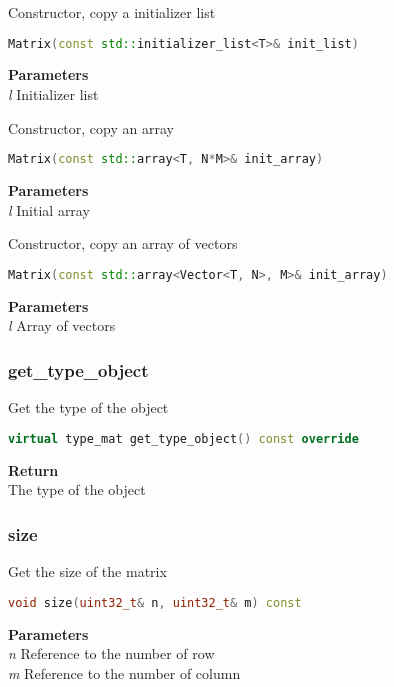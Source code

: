 \begin{mdframed}
Constructor, copy a initializer list
\begin{lstlisting}[language=C++]
Matrix(const std::initializer_list<T>& init_list)
\end{lstlisting}
\textbf{Parameters} \\ 
\textit{l} Initializer list \\ 
\end{mdframed}

\begin{mdframed}
Constructor, copy an array
\begin{lstlisting}[language=C++]
Matrix(const std::array<T, N*M>& init_array)
\end{lstlisting}
\textbf{Parameters} \\ 
\textit{l} Initial array \\ 
\end{mdframed}

\begin{mdframed}
Constructor, copy an array of vectors
\begin{lstlisting}[language=C++]
Matrix(const std::array<Vector<T, N>, M>& init_array)
\end{lstlisting}
\textbf{Parameters} \\ 
\textit{l} Array of vectors \\ 
\end{mdframed}

\subsubsection{get\_type\_object}
\begin{mdframed}
Get the type of the object
\begin{lstlisting}[language=C++]
virtual type_mat get_type_object() const override 
\end{lstlisting}
\textbf{Return} \\ 
The type of the object\\ 
\end{mdframed}

\subsubsection{size}
\begin{mdframed}
Get the size of the matrix
\begin{lstlisting}[language=C++]
void size(uint32_t& n, uint32_t& m) const 
\end{lstlisting}
\textbf{Parameters} \\ 
\textit{n} Reference to the number of row \\ 
\textit{m} Reference to the number of column \\ 
\end{mdframed}

